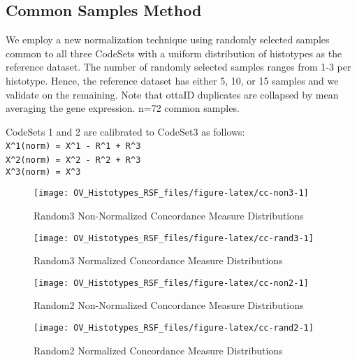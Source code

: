 \documentclass[
]{report}
\begin{document}
\hypertarget{common-samples-method-1}{%
\subsection{Common Samples Method}\label{common-samples-method-1}}

We employ a new normalization technique using randomly selected samples common to all three CodeSets with a uniform distribution of histotypes as the reference dataset. The number of randomly selected samples ranges from 1-3 per histotype. Hence, the reference dataset has either 5, 10, or 15 samples and we validate on the remaining. Note that ottaID duplicates are collapsed by mean averaging the gene expression. n=72 common samples.

CodeSets 1 and 2 are calibrated to CodeSet3 as follows:\\
\texttt{X\^{}1(norm)\ =\ X\^{}1\ -\ R\^{}1\ +\ R\^{}3}~\\
\texttt{X\^{}2(norm)\ =\ X\^{}2\ -\ R\^{}2\ +\ R\^{}3}~\\
\texttt{X\^{}3(norm)\ =\ X\^{}3}

\begin{figure}[H]

{\centering \texttt{[image: OV\_Histotypes\_RSF\_files/figure-latex/cc-non3-1]} 

}

\caption{Random3 Non-Normalized Concordance Measure Distributions}\label{fig:cc-non3}
\end{figure}

\begin{figure}[H]

{\centering \texttt{[image: OV\_Histotypes\_RSF\_files/figure-latex/cc-rand3-1]} 

}

\caption{Random3 Normalized Concordance Measure Distributions}\label{fig:cc-rand3}
\end{figure}

\begin{figure}[H]

{\centering \texttt{[image: OV\_Histotypes\_RSF\_files/figure-latex/cc-non2-1]} 

}

\caption{Random2 Non-Normalized Concordance Measure Distributions}\label{fig:cc-non2}
\end{figure}

\begin{figure}[H]

{\centering \texttt{[image: OV\_Histotypes\_RSF\_files/figure-latex/cc-rand2-1]} 

}

\caption{Random2 Normalized Concordance Measure Distributions}\label{fig:cc-rand2}
\end{figure}
\end{document}
